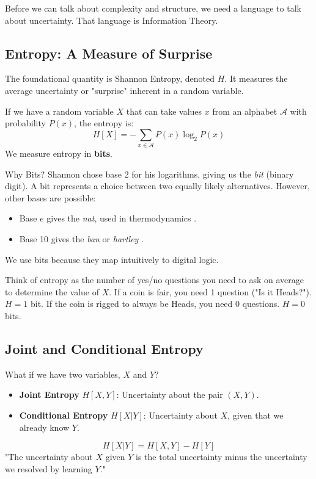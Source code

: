 Before we can talk about complexity and structure, we need a language to talk about uncertainty. That language is Information Theory.

\subsection{Entropy: A Measure of Surprise}
The foundational quantity is Shannon Entropy, denoted $H$. It measures the average uncertainty or "surprise" inherent in a random variable.

If we have a random variable $X$ that can take values $x$ from an alphabet $\mathcal{A}$ with probability $P(x)$, the entropy is:
\begin{equation}
    H[X] = - \sum_{x \in \mathcal{A}} P(x) \log_2 P(x)
\end{equation}
We measure entropy in \textbf{bits}.

\begin{sidebar}{Why Bits?}
    Shannon chose base 2 for his logarithms, giving us the \textit{bit} (binary digit). A bit represents a choice between two equally likely alternatives. However, other bases are possible:
    \begin{itemize}
        \item Base $e$ gives the \textit{nat}, used in thermodynamics \cite{shannon1948mathematical}.
        \item Base 10 gives the \textit{ban} or \textit{hartley} \cite{hartley1928transmission}.
    \end{itemize}
    We use bits because they map intuitively to digital logic.
\end{sidebar}

\begin{intuition}
    Think of entropy as the number of yes/no questions you need to ask on average to determine the value of $X$. If a coin is fair, you need 1 question ("Is it Heads?"). $H = 1$ bit. If the coin is rigged to always be Heads, you need 0 questions. $H = 0$ bits.
\end{intuition}

\subsection{Joint and Conditional Entropy}
What if we have two variables, $X$ and $Y$?
\begin{itemize}
    \item \textbf{Joint Entropy} $H[X, Y]$: Uncertainty about the pair $(X, Y)$.
    \item \textbf{Conditional Entropy} $H[X|Y]$: Uncertainty about $X$, given that we already know $Y$.
\end{itemize}
\begin{equation}
    H[X|Y] = H[X, Y] - H[Y]
\end{equation}
"The uncertainty about $X$ given $Y$ is the total uncertainty minus the uncertainty we resolved by learning $Y$."

